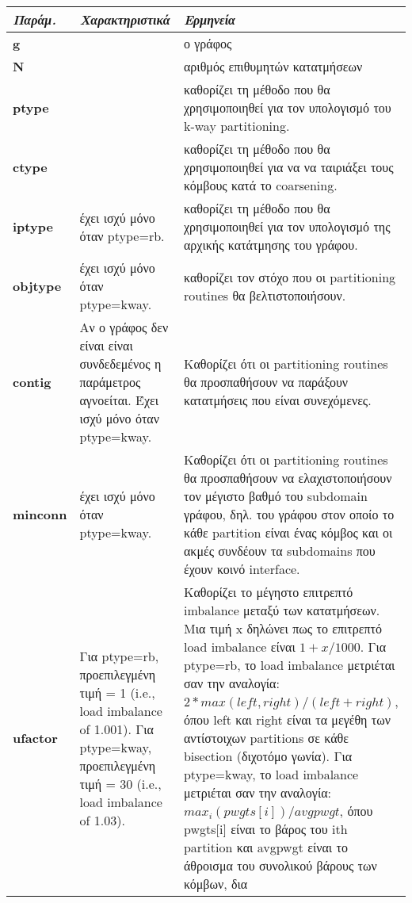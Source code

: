 \hspace{-10.5em}
    \begin{tabular}{ | p{1.7cm} | p{5.5cm} | p{12.0cm} |}
    \hline
    \emph{Παράμ.} & \emph{Χαρακτηριστικά} & \emph{Ερμηνεία} \\ \hline \hline
    \textbf{g} &   &  ο γράφος \\ \hline
    \textbf{N} &   &  αριθμός επιθυμητών κατατμήσεων \\ \hline
    \textbf{ptype} &    & καθορίζει τη μέθοδο που θα χρησιμοποιηθεί για τον υπολογισμό του
    k-way partitioning. \\ \hline
    \textbf{ctype} &    & καθορίζει τη μέθοδο που θα χρησιμοποιηθεί για να 
    να ταιριάξει τους κόμβους κατά το coarsening. \\ \hline
    \textbf{iptype} & έχει ισχύ μόνο όταν ptype=rb.  & καθορίζει τη μέθοδο που θα χρησιμοποιηθεί για
    τον υπολογισμό της αρχικής κατάτμησης του γράφου. \\ \hline
    \textbf{objtype} & έχει ισχύ μόνο όταν ptype=kway. & καθορίζει τον στόχο που οι partitioning
    routines θα βελτιστοποιήσουν. \\ \hline  
    \textbf{contig} & Αν ο γράφος δεν είναι είναι συνδεδεμένος η παράμετρος αγνοείται. Έχει ισχύ μόνο όταν ptype=kway. & Καθορίζει ότι οι partitioning routines
    θα προσπαθήσουν να παράξουν κατατμήσεις που είναι συνεχόμενες. \\ \hline
    \textbf{minconn} & έχει ισχύ μόνο όταν ptype=kway. & Καθορίζει ότι οι partitioning routines
    θα προσπαθήσουν να ελαχιστοποιήσουν τον μέγιστο βαθμό του subdomain γράφου, δηλ. του
    γράφου στον οποίο το κάθε partition είναι ένας κόμβος και οι ακμές συνδέουν τα subdomains 
    που έχουν  κοινό interface. \\ \hline  
    \textbf{ufactor} &  Για ptype=rb, προεπιλεγμένη τιμή = 1 (i.e., load imbalance of 1.001). Για ptype=kway, προεπιλεγμένη τιμή = 30 (i.e., load imbalance of 1.03). &  Καθορίζει το μέγηστο
    επιτρεπτό imbalance μεταξύ των κατατμήσεων. Μια τιμή x δηλώνει πως το επιτρεπτό load imbalance είναι $1+x/1000$. Για ptype=rb, το load imbalance μετριέται
    σαν την αναλογία: $2*max(left,right)/(left+right)$, όπου left και right είναι τα μεγέθη των αντίστοιχων partitions σε κάθε bisection (διχοτόμο γωνία). 
    Για ptype=kway, το load imbalance μετριέται σαν την αναλογία: 
    $max_i(pwgts[i])/avgpwgt$, όπου pwgts[i] είναι το βάρος του ith partition και avgpwgt είναι το άθροισμα του συνολικού βάρους των κόμβων, δια

\end{tabular}
